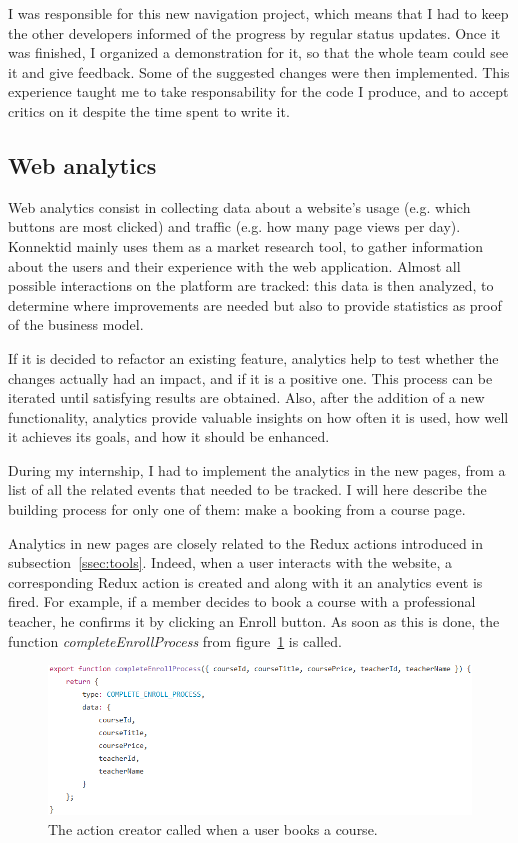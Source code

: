 I was responsible for this new navigation project, which means that I had to keep the other developers informed of the progress by regular status updates. Once it was finished, I organized a demonstration for it, so that the whole team could see it and give feedback. Some of the suggested changes were then implemented. This experience taught me to take responsability for the code I produce, and to accept critics on it despite the time spent to write it.

\subsection{Web analytics}
\label{ssec:analytics}

Web analytics consist in collecting data about a website's usage (e.g. which buttons are most clicked) and traffic (e.g. how many page views per day). Konnektid mainly uses them as a market research tool, to gather information about the users and their experience with the web application. Almost all possible interactions on the platform are tracked: this data is then analyzed, to determine where improvements are needed but also to provide statistics as proof of the business model.

If it is decided to refactor an existing feature, analytics help to test whether the changes actually had an impact, and if it is a positive one. This process can be iterated until satisfying results are obtained. Also, after the addition of a new functionality, analytics provide valuable insights on how often it is used, how well it achieves its goals, and how it should be enhanced.

During my internship, I had to implement the analytics in the new pages, from a list of all the related events that needed to be tracked. I will here describe the building process for only one of them: make a booking from a course page.

Analytics in new pages are closely related to the Redux actions introduced in {\sc subsection}~\ref{ssec:tools}. Indeed, when a user interacts with the website, a corresponding Redux action is created and along with it an analytics event is fired. For example, if a member decides to book a course with a professional teacher, he confirms it by clicking an \guillemotleft{} Enroll \guillemotright{} button. As soon as this is done, the function \textit{completeEnrollProcess} from {\sc figure}~\ref{fig:enroll} is called.

\begin{figure}[H]
    \centering
    \includegraphics[scale=0.9]{figure/enroll.png}
    \caption{The action creator called when a user books a course.}
    \label{fig:enroll}
\end{figure}

